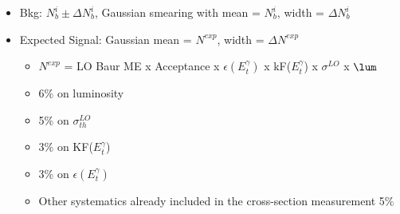 \documentclass[12pt,twoside,letterpaper]{article}
\begin{document}
	\begin{itemize}
	   \item Bkg: $N_b^i \pm \Delta N_b^i$, Gaussian smearing with mean = $N_b^i$, width = $\Delta N_b^i$
	   \item Expected Signal: Gaussian mean = $N^{exp}$, width = $\Delta N^{exp}$
	    \begin{itemize}
	       \item $N^{exp}$ = LO Baur ME x Acceptance x $\epsilon(E_t^{\gamma})$ x kF($E_t^{\gamma}$) x $\sigma^{LO}$ x $\lum$
	       \item 6\% on luminosity
	       \item 5\% on $\sigma^{LO}_{th}$
	       \item 3\% on KF($E_t^{\gamma}$)
	       \item 3\% on $\epsilon(E_t^{\gamma})$
	       \item Other systematics already included in the cross-section measurement 5\%
	    \end{itemize}
	\end{itemize}



\end{document}
